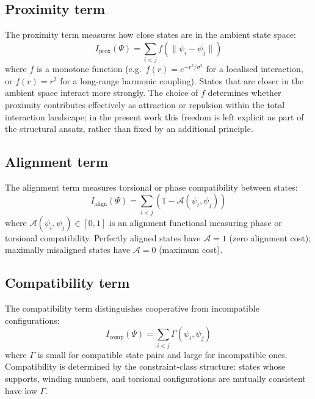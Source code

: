 \documentclass[12pt]{article}
\begin{document}
\subsection{Proximity term}

The proximity term measures how close states are in the ambient state space:
\begin{equation}\label{eq:prox}
    I_{\mathrm{prox}}(\Psi) = \sum_{i < j} f\!\left(\|\psi_i - \psi_j\|\right)
\end{equation}
where $f$ is a monotone function (e.g.\ $f(r) = e^{-r^2/\sigma^2}$ for a localised interaction, or $f(r) = r^2$ for a long-range harmonic coupling). States that are closer in the ambient space interact more strongly. The choice of $f$ determines whether proximity contributes effectively as attraction or repulsion within the total interaction landscape; in the present work this freedom is left explicit as part of the structural ansatz, rather than fixed by an additional principle.

\subsection{Alignment term}

The alignment term measures torsional or phase compatibility between states:
\begin{equation}\label{eq:align}
    I_{\mathrm{align}}(\Psi) = \sum_{i < j} \left(1 - \mathcal{A}(\psi_i, \psi_j)\right)
\end{equation}
where $\mathcal{A}(\psi_i, \psi_j) \in [0, 1]$ is an alignment functional measuring phase or torsional compatibility. Perfectly aligned states have $\mathcal{A} = 1$ (zero alignment cost); maximally misaligned states have $\mathcal{A} = 0$ (maximum cost).

\subsection{Compatibility term}

The compatibility term distinguishes cooperative from incompatible configurations:
\begin{equation}\label{eq:comp}
    I_{\mathrm{comp}}(\Psi) = \sum_{i < j} \Gamma(\psi_i, \psi_j)
\end{equation}
where $\Gamma$ is small for compatible state pairs and large for incompatible ones. Compatibility is determined by the constraint-class structure: states whose supports, winding numbers, and torsional configurations are mutually consistent have low $\Gamma$.
\end{document}
